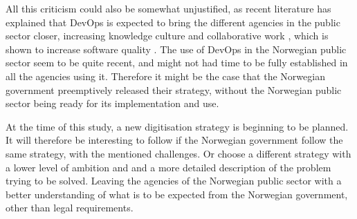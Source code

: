 All this criticism could also be somewhat unjustified, as recent literature has explained that DevOps is expected to bring the different agencies in the public sector closer, increasing knowledge culture and collaborative work \cite{mm_2021}, which is shown to increase software quality \cite{smm_2018}. The use of DevOps in the Norwegian public sector seem to be quite recent, and might not had time to be fully established in all the agencies using it. Therefore it might be the case that the Norwegian government preemptively released their strategy, without the Norwegian public sector being ready for its implementation and use.

At the time of this study, a new digitisation strategy is beginning to be planned. It will therefore be interesting to follow if the Norwegian government follow the same strategy, with the mentioned challenges. Or choose a different strategy with a lower level of ambition and and a more detailed description of the problem trying to be solved. Leaving the agencies of the Norwegian public sector with a better understanding of what is to be expected from the Norwegian government, other than legal requirements.





